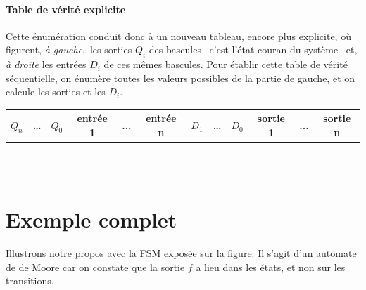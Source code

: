 \paragraph{Table de vérité explicite}

Cette énumération conduit donc à un nouveau tableau, encore plus explicite, où figurent, {\it à gauche}, les sorties $Q_i$ des bascules
--c'est l'état couran du système-- et, {\it à droite} les entrées $D_i$ de ces mêmes bascules. Pour établir cette
table de vérité séquentielle, on énumère toutes les valeurs possibles de la partie de gauche, et on calcule les sorties et les $D_i$.


\begin{table}[!htb]
  \centering
    \begin{tabular}{|c|c|c|c|c|c||c|c|c|c|c|c|}
        \hline
        $Q_n$ & \dots & $Q_0$ &  entrée 1 & ... & entrée n & $D_1$ & \dots & $D_0$ & sortie 1 & ... & sortie n \\ \hline
        ~   & ~    & ~  & ~  & ~  & ~  & ~  & ~  & ~        & ~   & ~ & ~        \\
        ~   & ~    & ~  & ~  & ~  & ~  & ~  & ~  & ~        & ~   & ~ & ~        \\
        \hline
    \end{tabular}
\end{table}

\section{Exemple complet}
Illustrons notre propos avec la FSM exposée sur la figure. Il s'agit d'un automate de de Moore car on constate que la sortie $f$ a lieu dans les états, et non sur les transitions.

